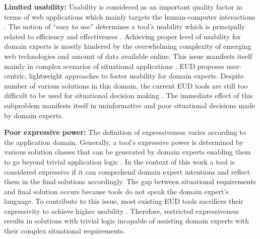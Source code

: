 \textbf{Limited usability:} Usability \autocite[cf.][def. 3.4451]{ISO/IEEE24765Vocabulary} is considered as an important
quality factor in terms of web applications which mainly targets the
human-computer interactions \autocite{Ponce2022}. The notion of ``easy to use''
determines a tool's usability which is principally related to efficiency
and effectiveness \autocite{Zhao2019}. Achieving proper level of
usability for domain experts is mostly hindered by the overwhelming
complexity of emerging web technologies and amount of data available
online. This issue manifests itself mainly in complex scenarios of
situational applications \autocite{Ponce2022} \autocite{Tang2021}. EUD
proposes user-centric, lightweight approaches to foster usability for
domain experts. Despite number of various solutions in this domain, the
current EUD tools are still too difficult to be used for situational
decision making \autocite{Zhao2019}. The immediate effect of this
subproblem manifests itself in uninformative and poor situational
decisions made by domain experts.

\textbf{Poor expressive power:} The definition of expressiveness varies
according to the application domain. Generally, a tool's
expressive power is determined by various solution classes that can be
generated by domain experts enabling them to go beyond trivial
application logic \autocite{Soi2013}. In the context of this work a tool is
considered expressive if it can comprehend domain expert intentions and
reflect them in the final solutions accordingly. The gap between
situational requirements and final solution occurs because tools do not
speak the domain expert's language. To contribute to this issue, most
existing EUD tools sacrifices their expressivity to achieve higher
usability \autocite{Ponce2022}. Therefore, restricted expressiveness results in
solutions with trivial logic incapable of assisting domain experts with
their complex situational requirements.


